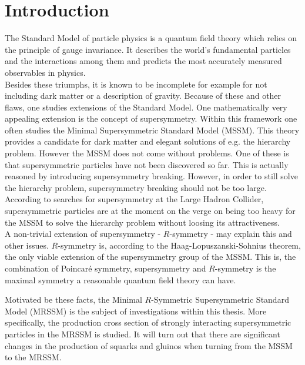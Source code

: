 \section{Introduction}
The Standard Model of particle physics is a quantum field theory which relies on the principle of gauge invariance. It describes the world's fundamental particles and the interactions among them and predicts the most accurately measured observables in physics.\\
Besides these triumphs, it is known to be incomplete for example for not including dark matter or a description of gravity. Because of these and other flaws, one studies extensions of the Standard Model. One mathematically very appealing extension is the concept of supersymmetry. Within this framework one often studies the Minimal Supersymmetric Standard Model (MSSM). This theory provides a candidate for dark matter and elegant solutions of e.g. the hierarchy problem. However the MSSM does not come without problems. One of these is that supersymmetric particles have not been discovered so far. This is  actually reasoned by introducing supersymmetry breaking. However, in order to still solve the hierarchy problem, supersymmetry breaking should not be too large. According to searches for supersymmetry at the Large Hadron Collider, supersymmetric particles are at the moment on the verge on being too heavy for the MSSM to solve the hierarchy problem without loosing its attractiveness.\\
A non-trivial extension of supersymmetry - $R$-symmetry - may explain this and other issues. $R$-symmetry is, according to the Haag-Lopuszanski-Sohnius theorem, the only viable extension of the supersymmetry group of the MSSM. This is, the combination of Poincaré symmetry, supersymmetry and $R$-symmetry is the maximal symmetry a reasonable quantum field theory can have.\\
Motivated be these facts, the Minimal $R$-Symmetric Supersymmetric Standard Model (MRSSM) is the subject of investigations within this thesis. More specifically, the production cross section of strongly interacting supersymmetric particles in the MRSSM is studied. It will turn out that there are significant changes in the production of squarks and gluinos when turning from the MSSM to the MRSSM.\\
